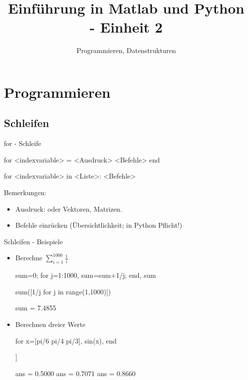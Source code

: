 \documentclass[hyperref={xetex}]{beamer}
\title{Einführung in Matlab und Python - Einheit 2}
\subtitle{Programmieren, Datenstrukturen}
\begin{document}
\titlepage




\section{Programmieren}
 

\subsection{Schleifen}
%
%
\begin{frame}[fragile]{for - Schleife}
\begin{matlabin}
for <indexvariable> = <Ausdruck>
  <Befehle>
end
\end{matlabin}
\begin{pyin}
for <indexvariable> in <Liste>:
  <Befehle>
\end{pyin}
\begin{pyin}
\end{pyin}
\alert{Bemerkungen:} 
\begin{itemize}
\item Ausdruck:  oder Vektoren, Matrizen. 
\item \alert{Befehle} einrücken (Übersichtlichkeit; in Python Pflicht!) 
\end{itemize}

\end{frame}

%
%
\begin{frame}[fragile]{Schleifen - Beispiele}
\begin{itemize}
\item Berechne $\sum_{i=1}^{1000} \frac{1}{i}$
\begin{matlabin}
sum=0; for j=1:1000, sum=sum+1/j; end, sum
\end{matlabin}
\begin{pyin}
sum([1/j for j in range(1,1000)])
\end{pyin}
\begin{matlab}
sum =  7.4855 
\end{matlab}
\item Berechnen dreier Werte
\begin{matlabin}
for x=[pi/6 pi/4 pi/3], sin(x), end
\end{matlabin}
\begin{pyin}
[sin(x) for x in [pi/6,pi/4,pi/3]]
\end{pyin}
\begin{matlab}
ans =    0.5000
ans =    0.7071
ans =    0.8660 
\end{matlab}
\end{itemize}
\end{frame}
\end{document}
